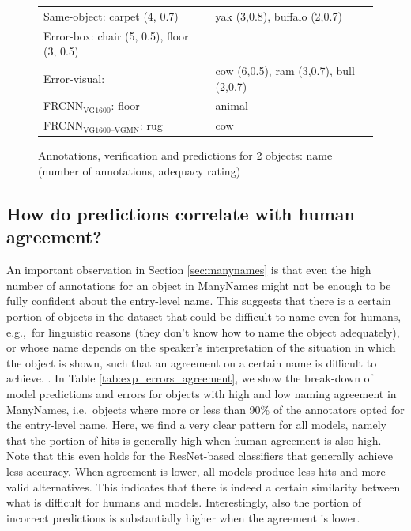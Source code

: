 \begin{figure}
\begin{tabular}{p{3.7cm}p{3.7cm}}
	\midrule
	Same-object: carpet (4, 0.7) &  yak (3,0.8), buffalo (2,0.7) \\
	Error-box: chair (5, 0.5), floor (3, 0.5) & \\
	Error-visual:  & cow (6,0.5), ram (3,0.7), bull (2,0.7)\\
	\midrule
	FRCNN$_{\text{VG1600}}$: floor & animal\\
	FRCNN$_{\text{VG1600--VGMN}}$: rug & cow \\
	\end{tabular}
	\caption{Annotations, verification and predictions for 2 objects: name (number of annotations, adequacy rating)}
	\label{fig:rug}
\end{figure}

\subsection{How do predictions correlate with human agreement?}

An important observation in Section \ref{sec:manynames} is that even the high number of annotations for an object in ManyNames might not be enough to be fully confident about the entry-level name.
This suggests that there is a certain portion of objects in the dataset that could be difficult to name even for humans, e.g.,~for linguistic reasons (they don't know how to name the object adequately), or whose name depends on the speaker's interpretation of the situation in which the object is shown, such that an agreement on a certain name is difficult to achieve. .
In Table \ref{tab:exp_errors_agreement}, we show the break-down of model predictions and errors for objects with high and low naming agreement in ManyNames, i.e.\ objects where more or less than 90\% of the annotators opted for the entry-level name. 
Here, we find a very clear pattern for all models, namely that the portion of hits is generally high when human agreement is also high.
Note that this even holds for the ResNet-based classifiers that generally achieve less accuracy.
When agreement is lower, all models produce less hits and more valid alternatives. 
This indicates that there is indeed a certain similarity between what is difficult for humans and models.
Interestingly, also the portion of incorrect predictions is substantially higher when the agreement is lower. 


